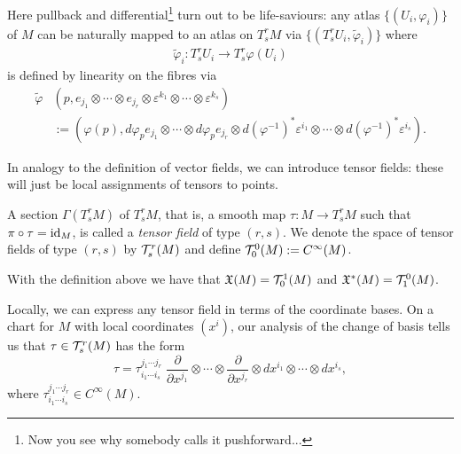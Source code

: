 Here pullback and differential\footnote{Now you see why somebody calls it pushforward...} turn out to be life-saviours:
any atlas $\{(U_i, \varphi_i)\}$ of $M$ can be naturally mapped to an atlas  on $T_s^r M$ via $\{(T_s^r U_i, \widetilde\varphi_i)\}$ where
\begin{align}
  \widetilde\varphi_i : T_s^r U_i \to T_s^r\varphi(U_i)
\end{align}
is defined by linearity on the fibres via
\begin{align}
  \widetilde\varphi & (p, e_{j_1}\otimes\cdots\otimes e_{j_r}\otimes \varepsilon^{k_1}\otimes \cdots\otimes \varepsilon^{k_s})                                                                     \\
                    & :=(\varphi(p), d\varphi_p e_{j_1}\otimes\cdots\otimes d\varphi_p e_{j_r}\otimes d(\varphi^{-1})^*\varepsilon^{i_1}\otimes \cdots\otimes d(\varphi^{-1})^*\varepsilon^{i_s}).
\end{align}

In analogy to the definition of vector fields, we can introduce tensor fields: these will just be local assignments of tensors to points.

\begin{definition}
  A section $\Gamma(T_s^r M)$ of $T_s^r M$, that is, a smooth map $\tau : M \to T_s^r M$ such that $\pi\circ \tau = \operatorname{id}_M$, is called a \emph{tensor field} of type $(r,s)$.
  We denote the space of tensor fields of type $(r,s)$ by $\mathcal{T}_s^r(M)$ and define $\mathcal{T}_0^0(M) := C^\infty(M)$.
\end{definition}

\begin{example}
  With the definition above we have that $\mathfrak{X}(M) = \mathcal{T}_0^1(M)$ and $\mathfrak{X}^*(M) = \mathcal{T}_1^0(M)$.
\end{example}

Locally, we can express any tensor field in terms of the coordinate bases.
On a chart for $M$ with local coordinates $(x^i)$, our analysis of the change of basis tells us that $\tau\in\mathcal{T}_s^r(M)$ has the form
\begin{equation}
  \tau = \tau^{j_1\cdots j_r}_{i_1\cdots i_s}\; \frac{\partial}{\partial x^{j_1}}\otimes\cdots\otimes\frac{\partial}{\partial x^{j_r}}\otimes dx^{i_1}\otimes\cdots\otimes dx^{i_s},
\end{equation}
where $\tau^{j_1\cdots j_r}_{i_1\cdots i_s}\in C^\infty(M)$.

